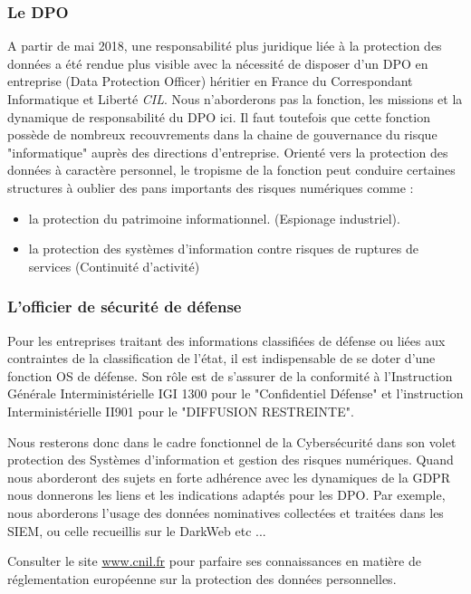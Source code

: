 \subsubsection{Le DPO}

A partir de mai 2018, une responsabilité plus juridique liée à la protection des données a été rendue plus visible avec la nécessité de disposer d'un DPO en entreprise (Data Protection Officer) héritier en France du Correspondant Informatique et Liberté \textit{CIL}.
Nous n'aborderons pas la fonction, les missions et la dynamique de responsabilité du DPO ici. Il faut toutefois que cette fonction possède de nombreux recouvrements dans la chaine de gouvernance du risque "informatique" auprès des directions d'entreprise. Orienté vers la protection des données à caractère personnel, le tropisme de la fonction peut conduire certaines structures à oublier des pans importants des risques numériques comme :

\begin{itemize}
	\item la protection du patrimoine informationnel. (Espionage industriel).
	\item la protection des systèmes d'information contre risques de ruptures de services (Continuité d'activité)
\end{itemize}

\subsubsection{L'officier de sécurité de défense}
Pour les entreprises traitant des informations classifiées de défense ou liées aux contraintes de la classification de l'état, il est indispensable de se doter d'une fonction OS de défense. Son rôle est de s'assurer de la conformité à l'Instruction Générale Interministérielle IGI 1300 pour le "Confidentiel Défense" et l'instruction Interministérielle II901 pour le "DIFFUSION RESTREINTE".

Nous resterons donc dans le cadre fonctionnel de la Cybersécurité dans son volet protection des Systèmes d'information et gestion des risques numériques.
Quand nous aborderont des sujets en forte adhérence avec les dynamiques de la GDPR nous donnerons les liens et les indications adaptés pour les DPO.
Par exemple, nous aborderons l'usage des données nominatives collectées et traitées dans les SIEM, ou celle recueillis sur le DarkWeb etc ...
\begin{remark}
Consulter le site \url{www.cnil.fr} pour parfaire ses connaissances en matière de réglementation européenne sur la protection des données personnelles. 
\end{remark}


